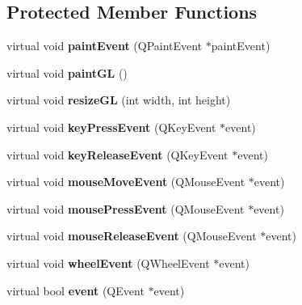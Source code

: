 \subsection*{Protected Member Functions}
\begin{DoxyCompactItemize}
\item 
\hypertarget{classNetworkViewer_a17c4c12ad9a2fbda3594a9e78b4906cd}{virtual void {\bfseries paint\-Event} (Q\-Paint\-Event $\ast$paint\-Event)}\label{classNetworkViewer_a17c4c12ad9a2fbda3594a9e78b4906cd}

\item 
\hypertarget{classNetworkViewer_a2c49c3d3501e61ddddafbbfdcbcf5890}{virtual void {\bfseries paint\-G\-L} ()}\label{classNetworkViewer_a2c49c3d3501e61ddddafbbfdcbcf5890}

\item 
\hypertarget{classNetworkViewer_a01a40bdfbb3d4fa38ef733a5cdbdfce4}{virtual void {\bfseries resize\-G\-L} (int width, int height)}\label{classNetworkViewer_a01a40bdfbb3d4fa38ef733a5cdbdfce4}

\item 
\hypertarget{classNetworkViewer_a9002909ad3d5c9c380f8af24cc7dfda2}{virtual void {\bfseries key\-Press\-Event} (Q\-Key\-Event $\ast$event)}\label{classNetworkViewer_a9002909ad3d5c9c380f8af24cc7dfda2}

\item 
\hypertarget{classNetworkViewer_a72fd3375fadcecf5ef2d7659ae01e855}{virtual void {\bfseries key\-Release\-Event} (Q\-Key\-Event $\ast$event)}\label{classNetworkViewer_a72fd3375fadcecf5ef2d7659ae01e855}

\item 
\hypertarget{classNetworkViewer_a43a29c2847490d713ef6e67d64a69ec1}{virtual void {\bfseries mouse\-Move\-Event} (Q\-Mouse\-Event $\ast$event)}\label{classNetworkViewer_a43a29c2847490d713ef6e67d64a69ec1}

\item 
\hypertarget{classNetworkViewer_a5f6fe634093c6a84b6c7a17874a892d2}{virtual void {\bfseries mouse\-Press\-Event} (Q\-Mouse\-Event $\ast$event)}\label{classNetworkViewer_a5f6fe634093c6a84b6c7a17874a892d2}

\item 
\hypertarget{classNetworkViewer_a47bfd07665faf9ae2f666f5606e20645}{virtual void {\bfseries mouse\-Release\-Event} (Q\-Mouse\-Event $\ast$event)}\label{classNetworkViewer_a47bfd07665faf9ae2f666f5606e20645}

\item 
\hypertarget{classNetworkViewer_afae1fb278367ebcc033eabae20944e2f}{virtual void {\bfseries wheel\-Event} (Q\-Wheel\-Event $\ast$event)}\label{classNetworkViewer_afae1fb278367ebcc033eabae20944e2f}

\item 
\hypertarget{classNetworkViewer_aa85d947a8547b5de37f6022e578563f6}{virtual bool {\bfseries event} (Q\-Event $\ast$event)}\label{classNetworkViewer_aa85d947a8547b5de37f6022e578563f6}

\end{DoxyCompactItemize}


